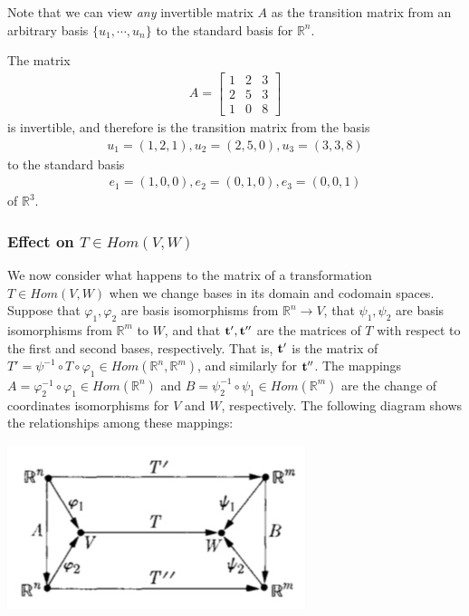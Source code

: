\documentclass[12pt,letterpaper,reqno]{article}
\numberwithin{equation}{section}
\newcommand{\ti}[1]{\textit{#1}}
\begin{document}
Note that we can view \ti{any} invertible matrix $A$ as the transition matrix from an arbitrary basis $\{u_1,\cdots,u_n\}$ to the standard basis for $\mathbb{R}^n$.

\begin{example}
The matrix
\begin{align*}
	A=\begin{bmatrix}
		1 & 2 & 3 \\ 2 & 5 & 3 \\ 1 & 0 & 8
	\end{bmatrix}
\end{align*}	
is invertible, and therefore is the transition matrix from the basis
\begin{align*}
	u_1=(1,2,1), u_2=(2,5,0), u_3=(3,3,8)
\end{align*}
to the standard basis 
\begin{align*}
	e_1=(1,0,0), e_2=(0,1,0), e_3=(0,0,1)
\end{align*}
of $\mathbb{R}^3$.
\end{example}




\subsubsection{Effect on $T \in Hom(V,W)$}
We now consider what happens to the matrix of a transformation $T \in Hom(V,W)$ when we change bases in its domain and codomain spaces. Suppose that $\varphi_1,\varphi_2$ are basis isomorphisms from $\mathbb{R}^n \to V$, that $\psi_1,\psi_2$ are basis isomorphisms from $\mathbb{R}^m$ to $W$, and that ${\bf t}', {\bf t}''$ are the matrices of $T$ with respect to the first and second bases, respectively. That is, ${\bf t}'$ is the matrix of $T'=\psi^{-1} \circ T \circ \varphi_1 \in Hom(\mathbb{R}^n,\mathbb{R}^m)$, and similarly for ${\bf t}''$. The mappings $A=\varphi_2^{-1}\circ \varphi_1 \in Hom(\mathbb{R}^n)$ and $B=\psi_2^{-1}\circ \psi_1 \in Hom(\mathbb{R}^m)$ are the change of coordinates isomorphisms for $V$ and $W$, respectively. The following diagram shows the relationships among these mappings: 

\begin{center}
	\includegraphics[scale=0.5]{figures_mvc/change_of_basis_mappings}
\end{center}
\end{document}
